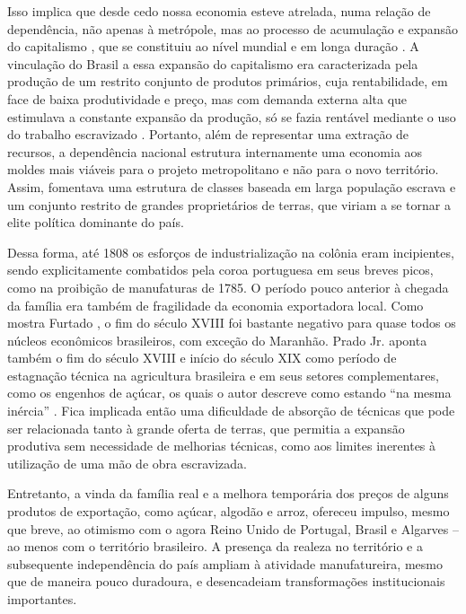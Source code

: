 Isso implica que desde cedo nossa economia esteve atrelada, numa relação
de dependência, não apenas à metrópole, mas ao processo de acumulação e
expansão do capitalismo
\citep{pradojunior2012},
que se constituiu ao nível mundial \citep{wallerstein2001} e em longa
duração \citep{braudel1990}. A vinculação do Brasil a essa expansão do capitalismo era
caracterizada pela produção de um restrito conjunto de produtos
primários, cuja rentabilidade, em face de baixa produtividade e preço,
mas com demanda externa alta que estimulava a constante expansão da
produção, só se fazia rentável mediante o uso do trabalho escravizado
\citep{mello1982}.
Portanto, além de representar uma extração de recursos, a dependência
nacional estrutura internamente uma economia aos moldes mais viáveis
para o projeto metropolitano e não para o novo território. Assim, fomentava uma
estrutura de classes baseada em larga população escrava e um conjunto
restrito de grandes proprietários de terras, que viriam a se tornar a
elite política dominante do país.

Dessa forma, até 1808 os esforços de industrialização na colônia eram
incipientes, sendo explicitamente combatidos pela coroa portuguesa em
seus breves picos, como na proibição de manufaturas de 1785. O período
pouco anterior à chegada da família era também de fragilidade da
economia exportadora local. Como mostra Furtado
\citeyearpar{furtado2005}, o fim do
século XVIII foi bastante negativo para quase todos os núcleos
econômicos brasileiros, com exceção do Maranhão. Prado Jr.
\citeyearpar{pradojunior2012} aponta também
o fim do século XVIII e início do século XIX como período de estagnação
técnica na agricultura brasileira e em seus setores complementares, como
os engenhos de açúcar, os quais o autor descreve como estando ``na mesma
inércia'' \citep[p.~62]{pradojunior2012}. Fica implicada então uma dificuldade de absorção
de técnicas que pode ser relacionada tanto à grande oferta de terras, que
permitia a expansão produtiva sem necessidade de melhorias técnicas, como aos limites
inerentes à utilização de uma mão de obra escravizada.

Entretanto, a vinda da família real e a melhora temporária dos preços de
alguns produtos de exportação, como açúcar, algodão e arroz, ofereceu
impulso, mesmo que breve, ao otimismo com o agora Reino Unido de
Portugal, Brasil e Algarves -- ao menos com o território brasileiro. A
presença da realeza no território e a subsequente independência do país
ampliam à atividade manufatureira, mesmo que de maneira pouco duradoura,
e desencadeiam transformações institucionais importantes.

